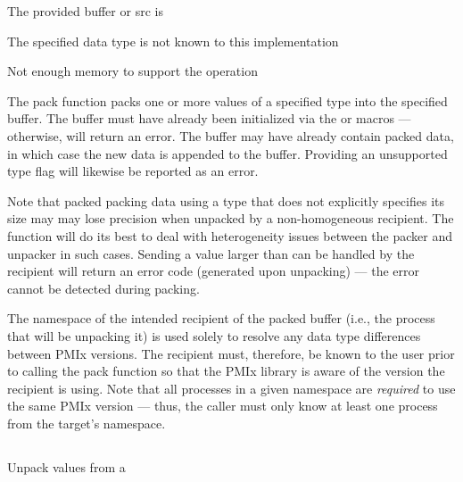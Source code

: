 \returnstart
\begin{constantdesc}
\item {} The provided buffer or src is 
\item {} The specified data type is not known to this implementation
\item {} Not enough memory to support the operation
\end{constantdesc}
\returnend

\descr

The pack function packs one or more values of a specified type into the specified buffer.  The buffer must have already been
initialized via the  or 
macros --- otherwise,  will return an error.  
The buffer may have already contain packed data, in which case the new data is appended to the buffer.
Providing an unsupported type flag will likewise be reported as an error.

Note that packed packing data using a type that 
does not explicitly specifies its size may
may lose precision when unpacked
by a non-homogeneous recipient.  The  function will do its best to deal
with heterogeneity issues between the packer and unpacker in such
cases. Sending a value larger than can be handled by the recipient
will return an error code (generated upon unpacking) ---
the error cannot be detected during packing.

The namespace of the intended recipient of the packed buffer (i.e., the
process that will be unpacking it) is used solely to resolve any data type
differences between \ac{PMIx} versions. The recipient must, therefore, be
known to the user prior to calling the pack function so that the
\ac{PMIx} library is aware of the version the recipient is using. Note that
all processes in a given namespace are \textit{required} to use the same \ac{PMIx}
version --- thus, the caller must only know at least one process from the
target's namespace.


\subsection{}

\summary

Unpack values from a 

